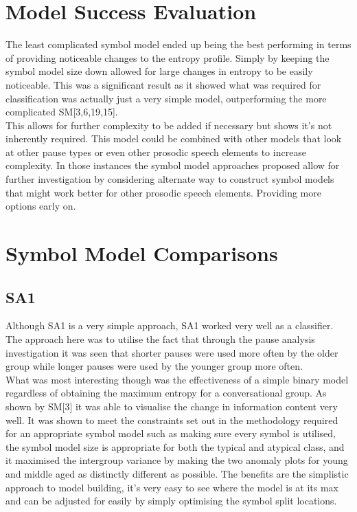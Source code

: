 

\section{Model Success Evaluation}
The least complicated symbol model ended up being the best performing in terms of providing noticeable changes to the entropy profile. Simply by keeping the symbol model size down allowed for large changes in entropy to be easily noticeable. This was a significant result as it showed what was required for classification was actually just a very simple model, outperforming the more complicated SM[3,6,19,15]. \\

This allows for further complexity to be added if necessary but shows it's not inherently required. This model could be combined with other models that look at other pause types or even other prosodic speech elements to increase complexity. In those instances the symbol model approaches proposed allow for further investigation by considering alternate way to construct symbol models that might work better for other prosodic speech elements. Providing more options early on. 



\section{Symbol Model Comparisons}
\subsection{SA1}
Although SA1 is a very simple approach, SA1 worked very well as a classifier. The approach here was to utilise the fact that through the pause analysis investigation it was seen that shorter pauses were used more often by the older group while longer pauses were used by the younger group more often. \\

What was most interesting though was the effectiveness of a simple binary model regardless of obtaining the maximum entropy for a conversational group. As shown by SM[3] it was able to visualise the change in information content very well. It was shown to meet the constraints set out in the methodology required for an appropriate symbol model such as making sure every symbol is utilised, the symbol model size is appropriate for both the typical and atypical class, and it maximised the intergroup variance by making the two anomaly plots for young and middle aged as distinctly different as possible. The benefits are the simplistic approach to model building, it's very easy to see where the model is at its max and can be adjusted for easily by simply optimising the symbol split locations.\\

